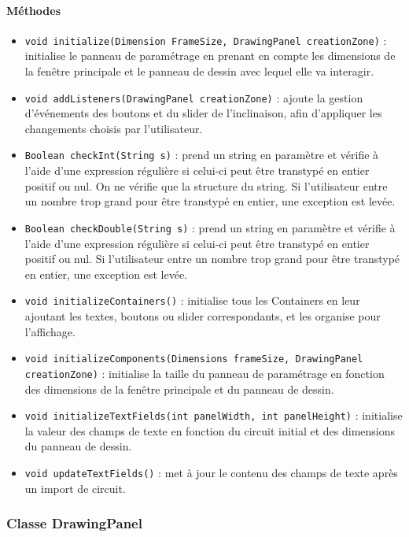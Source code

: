 \documentclass{report}
\begin{document}
\paragraph*{Méthodes}
\begin{itemize}
\item \texttt{void initialize(Dimension FrameSize, DrawingPanel creationZone)} : initialise le panneau de paramétrage en prenant en compte les dimensions de la fenêtre principale et le panneau de dessin avec lequel elle va interagir.
\item \texttt{void addListeners(DrawingPanel creationZone)} : ajoute la gestion d'événements des boutons et du slider de l'inclinaison, afin d'appliquer les changements choisis par l'utilisateur.
\item \texttt{Boolean checkInt(String s)} : prend un string en paramètre et vérifie à l'aide d'une expression régulière si celui-ci peut être transtypé en entier positif ou nul. On ne vérifie que la structure du string. Si l'utilisateur entre un nombre trop grand pour être transtypé en entier, une exception est levée.
\item \texttt{Boolean checkDouble(String s)} : prend un string en paramètre et vérifie à l'aide d'une expression régulière si celui-ci peut être transtypé en entier positif ou nul. Si l'utilisateur entre un nombre trop grand pour être transtypé en entier, une exception est levée.
\item \texttt{void initializeContainers()} : initialise tous les Containers en leur ajoutant les textes, boutons ou slider correspondants, et les organise pour l'affichage.
\item \texttt{void initializeComponents(Dimensions frameSize, DrawingPanel creationZone)} : initialise la taille du panneau de paramétrage en fonction des dimensions de la fenêtre principale et du panneau de dessin.
\item \texttt{void initializeTextFields(int panelWidth, int panelHeight)} : initialise la valeur des champs de texte en fonction du circuit initial et des dimensions du panneau de dessin.
\item \texttt{void updateTextFields()} : met à jour le contenu des champs de texte après un import de circuit.
\end{itemize}

\subsubsection{Classe DrawingPanel}
\end{document}

